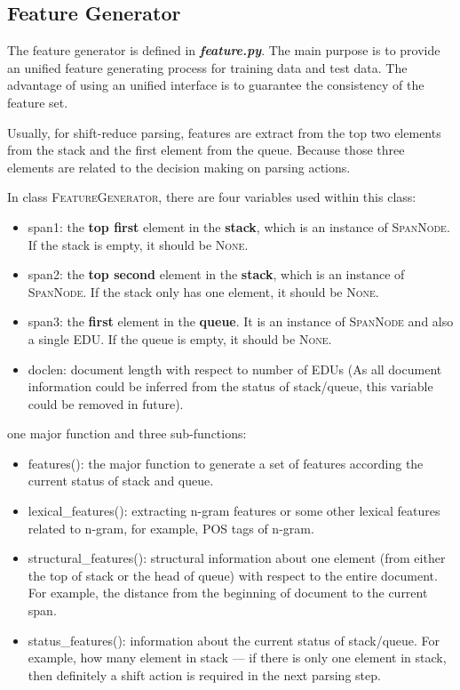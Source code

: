 \documentclass[12pt]{article}
\newcommand{\codefile}[1]{\textbf{\textit{#1}}}
\newcommand{\codefunc}[1]{\textsf{#1}}
\newcommand{\codeclass}[1]{\textsc{#1}}
\begin{document}
\subsection{Feature Generator}

The feature generator is defined in \codefile{feature.py}. The main purpose is to provide an unified feature generating process for training data and test data. The advantage of using an unified interface is to guarantee the consistency of the feature set.

Usually, for shift-reduce parsing, features are extract from the top two elements from the stack and the first element from the queue. Because those three elements are related to the decision making on parsing actions. 

In class \codeclass{FeatureGenerator}, there are four variables used within this class:
\begin{itemize}
\item \codefunc{span1}: the {\bf top first} element in the {\bf stack}, which is an instance of \codeclass{SpanNode}. If the stack is empty, it should be \codeclass{None}.
\item \codefunc{span2}: the {\bf top second} element in the {\bf stack}, which is an instance of \codeclass{SpanNode}. If the stack only has one element, it should be \codeclass{None}.
\item \codefunc{span3}: the {\bf first} element in the {\bf queue}. It is an instance of \codeclass{SpanNode} and also a single EDU. If the queue is empty, it should be \codeclass{None}.
\item \codefunc{doclen}: document length with respect to number of EDUs (As all document information could be inferred from the status of stack/queue, this variable could be removed in future).
\end{itemize}


one major function and three sub-functions:
\begin{itemize}
\item \codefunc{features()}: the major function to generate a set of features according the current status of stack and queue.
\item \codefunc{lexical\_features()}: extracting n-gram features or some other lexical features related to n-gram, for example, POS tags of n-gram.
\item \codefunc{structural\_features()}: structural information about one element (from either the top of stack or the head of queue) with respect to the entire document. For example, the distance from the beginning of document to the current span.
\item \codefunc{status\_features()}: information about the current status of stack/queue. For example, how many element in stack --- if there is only one element in stack, then definitely a shift action is required in the next parsing step.
\end{itemize}
\end{document}
